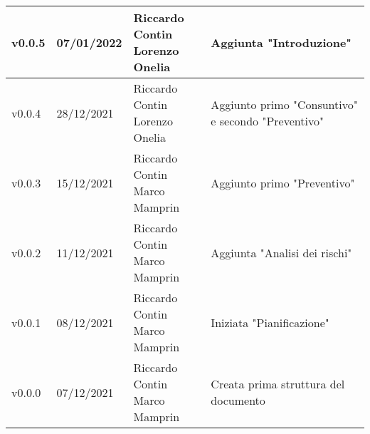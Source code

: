 \begin{center}
\begin{longtable}{|p{2cm}|p{2cm}|p{4cm}|p{5cm}|}
    \rowcolor[HTML]{EFEFEF}
    v0.0.5            & 07/01/2022    & \aCapo{Riccardo Contin\\Lorenzo Onelia}               & Aggiunta "Introduzione" \\ \hline
    \rowcolor[HTML]{C0C0C0}
    v0.0.4            & 28/12/2021    & \aCapo{Riccardo Contin\\Lorenzo Onelia}               & Aggiunto primo "Consuntivo" e secondo "Preventivo" \\ \hline
    \rowcolor[HTML]{EFEFEF}
    v0.0.3            & 15/12/2021    & \aCapo{Riccardo Contin\\Marco Mamprin}                & Aggiunto primo "Preventivo" \\ \hline
    \rowcolor[HTML]{C0C0C0}
    v0.0.2            & 11/12/2021    & \aCapo{Riccardo Contin\\Marco Mamprin}                & Aggiunta "Analisi dei rischi" \\ \hline
    \rowcolor[HTML]{EFEFEF}
    v0.0.1            & 08/12/2021    & \aCapo{Riccardo Contin\\Marco Mamprin}                & Iniziata "Pianificazione" \\ \hline
    \rowcolor[HTML]{C0C0C0}
    v0.0.0            & 07/12/2021    & \aCapo{Riccardo Contin\\Marco Mamprin}                & Creata prima struttura del documento \\ \hline
  \end{longtable}
\end{center}